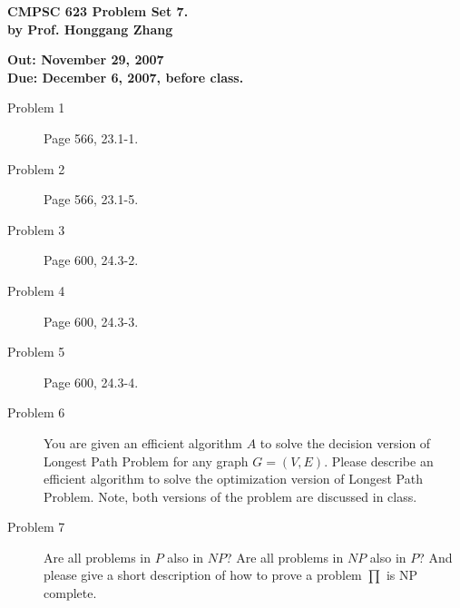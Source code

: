 \documentclass[11pt]{article}
\begin{document}

\begin{center}
{\bf CMPSC 623 Problem Set 7. } \\
{\bf by Prof. Honggang Zhang} \\
\end{center}
\begin{center}
{\bf Out: November 29, 2007} \\
{\bf Due: December 6, 2007, before class.} \\

\end{center}


\begin{description}


\item[Problem 1] Page 566, 23.1-1.

\item[Problem 2] Page 566, 23.1-5.

\item[Problem 3] Page 600, 24.3-2.

\item[Problem 4] Page 600, 24.3-3.

\item[Problem 5] Page 600, 24.3-4.

\item[Problem 6] You are given an efficient algorithm $A$ to solve the decision version of Longest
Path Problem for any graph $G=(V,E)$. Please describe an efficient algorithm to solve the
optimization version of Longest Path Problem. Note, both versions of the problem are discussed in
class.

\item[Problem 7] Are all problems in $P$ also in $NP$? Are all problems in $NP$ also in $P$? And please give a short description of how
to prove a problem $\prod$ is NP complete.

\end{description}
\end{document}
